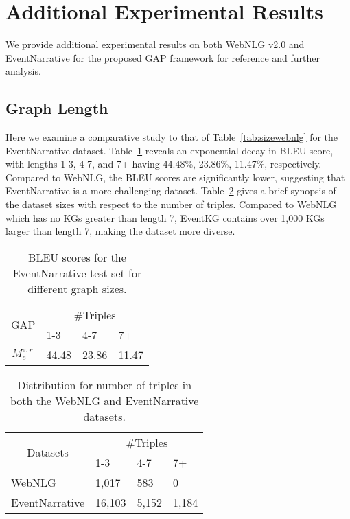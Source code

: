 \documentclass[11pt]{article}
\begin{document}
\section{Additional Experimental Results}
\label{sec:addexper}
We provide additional experimental results on both WebNLG v2.0 and EventNarrative for the proposed GAP framework for reference and further analysis. 
\subsection{Graph Length}
Here we examine a comparative study to that of Table~\ref{tab:sizewebnlg} for the EventNarrative dataset. Table~\ref{tab:sizeEvent} reveals an exponential decay in BLEU score, with lengths 1-3, 4-7, and 7+ having 44.48\%, 23.86\%, 11.47\%, respectively. Compared to WebNLG, the BLEU scores are significantly lower, suggesting that EventNarrative is a more challenging dataset. Table~\ref{tab:datasetsizes} gives a brief synopsis of the dataset sizes with respect to the number of triples. Compared to WebNLG which has no KGs greater than length 7, EventKG contains over 1,000 KGs larger than length 7, making the dataset more diverse.



\begin{table}[H]
\centering
\begin{tabular}{clll}
\hline
\multirow{2}{*}{GAP}                        & \multicolumn{3}{c}{\#Triples} \\ \cline{2-4} 
                                            & 1-3      & 4-7      & 7+      \\ \hline
\multicolumn{1}{l}{$ {}^{}_{}M^{e,r}_{e} $} & 44.48    & 23.86    & 11.47  \\ \hline
\end{tabular}
\caption{\label{tab:sizeEvent} BLEU scores for the EventNarrative test set for different graph sizes.}
\end{table}

\begin{table}[H]
\centering
\begin{tabular}{llll}
\hline
\multicolumn{1}{c}{\multirow{2}{*}{Datasets}} & \multicolumn{3}{c}{\#Triples} \\ \cline{2-4} 
\multicolumn{1}{c}{}                          & 1-3       & 4-7     & 7+      \\ \hline
WebNLG                                        & 1,017      & 583     & 0       \\ \hline
EventNarrative                                & 16,103     & 5,152    & 1,184    \\ \hline
\end{tabular}
\caption{\label{tab:datasetsizes} Distribution for number of triples in both the WebNLG and EventNarrative datasets.}
\end{table}
\end{document}
